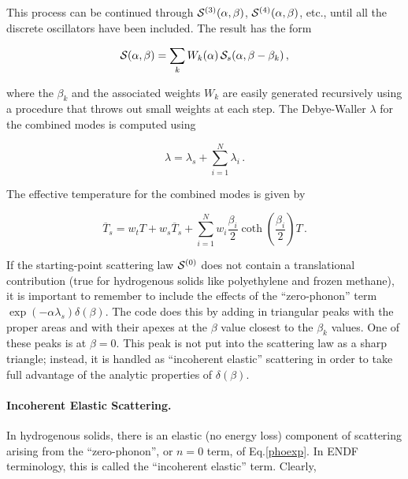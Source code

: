 \noindent
This process can be continued through ${\cal S}^{(3)}(\alpha,\beta)$,
${\cal S}^{(4)}(\alpha,\beta)$, etc., until all the discrete oscillators
have been included.  The result has the form

\begin{equation}
  {\cal S}(\alpha,\beta)=\sum_k W_k(\alpha)\,
          {\cal S}_s(\alpha,\beta-\beta_k)\,,
\end{equation}

\noindent
where the $\beta_k$ and the associated weights $W_k$ are easily
generated recursively using a procedure that throws out small weights
at each step.  The Debye-Waller $\lambda$ for the combined
modes is computed using

\begin{equation}
  \lambda=\lambda_s+\sum_{i=1}^N \lambda_i\,.
\end{equation}

\noindent
The effective temperature for the
combined modes is given by

\begin{equation}
   \overline{T}_s=w_t T + w_s \overline{T}_s
    + \sum_{i=1}^N w_i \frac{\beta_i}{2}
     \coth\left(\frac{\beta_i}{2}\right) T\,.
\end{equation}

If the starting-point scattering law ${\cal S}^{(0)}$ does not contain
a translational contribution (true for hydrogenous solids like
polyethylene and frozen methane), it is important to remember to
include the effects of the ``zero-phonon'' term
$\exp(-\alpha\lambda_s)\delta(\beta)$.  The code does this by
adding in triangular peaks with the proper areas and with their apexes
at the $\beta$ value closest to the $\beta_k$ values.  One of these
peaks is at $\beta{=}0$.  This peak is not put into the scattering
law as a sharp triangle; instead, it is handled as
``incoherent elastic'' scattering in order to take full advantage of
the analytic properties of $\delta(\beta)$.

\paragraph{Incoherent Elastic Scattering.}
In hydrogenous solids, there is an elastic (no energy loss) component of
scattering arising from the ``zero-phonon'', or $n{=}0$ term, of
Eq.\ref{phoexp}.  In ENDF terminology, this is called the ``incoherent
elastic'' term.
Clearly,


